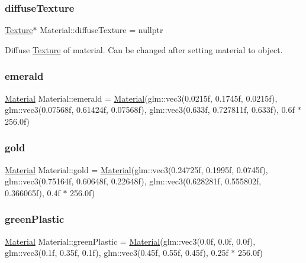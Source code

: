 \subsubsection{\texorpdfstring{diffuseTexture}{diffuseTexture}}
{\footnotesize\ttfamily \mbox{\hyperlink{class_texture}{Texture}}$\ast$ Material\+::diffuse\+Texture = nullptr}



Diffuse \mbox{\hyperlink{class_texture}{Texture}} of material. Can be changed after setting material to object. 

\mbox{\label{struct_material_ad6a424d01ca060a25ce520c4dc5b00c2}} 
\subsubsection{\texorpdfstring{emerald}{emerald}}
{\footnotesize\ttfamily \mbox{\hyperlink{struct_material}{Material}} Material\+::emerald = \mbox{\hyperlink{struct_material}{Material}}(glm\+::vec3(0.\+0215f, 0.\+1745f, 0.\+0215f), glm\+::vec3(0.\+07568f, 0.\+61424f, 0.\+07568f), glm\+::vec3(0.\+633f, 0.\+727811f, 0.\+633f), 0.\+6f $\ast$ 256.\+0f)\hspace{0.3cm}{\ttfamily [static]}}

\mbox{\label{struct_material_ae23eaaf9a27a2b9d9a218d1ea3f803e0}} 
\subsubsection{\texorpdfstring{gold}{gold}}
{\footnotesize\ttfamily \mbox{\hyperlink{struct_material}{Material}} Material\+::gold = \mbox{\hyperlink{struct_material}{Material}}(glm\+::vec3(0.\+24725f, 0.\+1995f, 0.\+0745f), glm\+::vec3(0.\+75164f, 0.\+60648f, 0.\+22648f), glm\+::vec3(0.\+628281f, 0.\+555802f, 0.\+366065f), 0.\+4f $\ast$ 256.\+0f)\hspace{0.3cm}{\ttfamily [static]}}

\mbox{\label{struct_material_abaddc1454d8d34f501be471246853856}} 
\subsubsection{\texorpdfstring{greenPlastic}{greenPlastic}}
{\footnotesize\ttfamily \mbox{\hyperlink{struct_material}{Material}} Material\+::green\+Plastic = \mbox{\hyperlink{struct_material}{Material}}(glm\+::vec3(0.\+0f, 0.\+0f, 0.\+0f), glm\+::vec3(0.\+1f, 0.\+35f, 0.\+1f), glm\+::vec3(0.\+45f, 0.\+55f, 0.\+45f), 0.\+25f $\ast$ 256.\+0f)\hspace{0.3cm}{\ttfamily [static]}}


